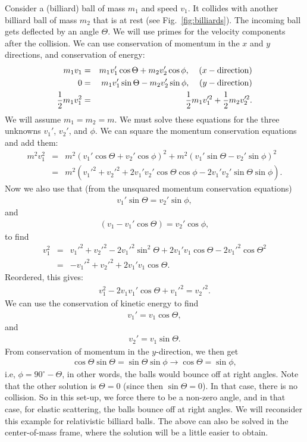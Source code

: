 \documentclass[12pt]{article}
\newcommand{\be}{\begin{eqnarray}}
\newcommand{\ee}{\end{eqnarray}}
\newif\ifshowboardquestion
\begin{document}
Consider a (billiard) ball of mass $m_1$ and speed $v_1$. It collides with another billiard ball of mass $m_2$ that is at rest (see Fig.~\ref{fig:billiards}). The incoming ball gets deflected by an angle $\Theta$. We will use primes for the velocity components after the collision. We can use conservation of momentum in the $x$ and $y$ directions, and conservation of energy:
\be
m_1 v_1  &=& m_1 v_1' \cos \Theta + m_2 v_2' \cos \phi,\;\;\;\;(x-{\rm direction}) \\
0 &=& m_1 v_1' \sin \Theta - m_2 v_2' \sin \phi,\;\;\;\;(y-{\rm direction}) \\
\frac{1}{2} m_1 v_1^2 &=& \frac{1}{2} m_1 v_1'^2 + \frac{1}{2} m_2 v_2'^2. 
\ee
We will assume $m_1 = m_2 = m$. We must solve these equations for the three unknowns $v_1'$, $v_2'$, and $\phi$. We can square the momentum conservation equations and add them:
\be
m^2 v_1^2 &=& m^2(v_1' \cos \Theta + v_2' \cos \phi)^2 + m^2(v_1' \sin \Theta - v_2' \sin \phi)^2\nonumber \\
&=& m^2 (v_1'^2 + v_2'^2  + 2 v_1' v_2' \cos \Theta \cos \phi -2 v_1' v_2' \sin \Theta \sin \phi).
\ee
Now we also use that (from the unsquared momentum conservation equations)
\be
v_1' \sin \Theta = v_2' \sin \phi,
\ee
and 
\be
(v_1 - v_1'\cos \Theta) = v_2' \cos \phi,
\ee
to find 
\be
v_1^2 &=& v_1'^2 + v_2'^2 -2 v_1'^2 \sin^2 \Theta + 2 v_1'v_1\cos \Theta - 2 v_1'^2 \cos\Theta^2 \nonumber \\
&=& -v_1'^2 + v_2'^2 + 2v_1' v_1 \cos \Theta.
\ee
Reordered, this gives:
\be
v_1^2 - 2 v_1 v_1' \cos \Theta + v_1'^2 = v_2'^2.
\ee
We can use the conservation of kinetic energy to find 
\be
v_1' = v_1 \cos \Theta,
\ee
and 
\be
v_2' = v_1 \sin \Theta.
\ee
From conservation of momentum in the $y$-direction, we then get 
\be
 \cos \Theta \sin \Theta = \sin \Theta \sin \phi \rightarrow \cos \Theta = \sin \phi,
\ee
i.e, $\phi = 90^{\circ} - \Theta$, in other words, the balls would bounce off at right angles. Note that the other solution is $\Theta = 0$ (since then $\sin \Theta = 0$). In that case, there is no collision. So in this set-up, we force there to be a non-zero angle, and in that case, for elastic scattering, the balls bounce off at right angles. We will reconsider this example for relativistic billiard balls. The above can also be solved in the center-of-mass frame, where the solution will be a little easier to obtain.   

\ifshowboardquestion
\end{document}
